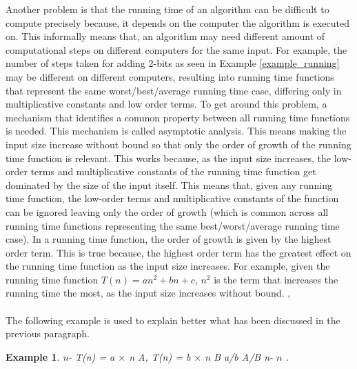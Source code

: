 \documentclass[12pt]{article}
\newtheorem{example}[definition]{Example}
\numberwithin{equation}{subsection}
\numberwithin{table}{subsection}
\numberwithin{algorithm}{subsection}
\begin{document}
Another problem is that the running time of an algorithm can be difficult to compute precisely because, it depends on the computer the algorithm is executed on. This informally means that, an algorithm may need different amount of computational steps on different computers for the same input. For example, the number of steps taken for adding 2-bits as seen in Example \ref{example_running} may be different on different computers, resulting into running time functions that represent the same worst/best/average running time case, differing only in multiplicative constants and low order terms. To get around this problem, a mechanism that identifies a common property between all running time functions is needed. This mechanism is called asymptotic analysis. This means making the input size increase without bound so that only the order of growth of the running time function is relevant. This works because, as the input size increases, the low-order terms and multiplicative constants of the running time function get dominated by the size of the input itself. This means that, given any running time function, the low-order terms and multiplicative constants of the function can be ignored leaving only the order of growth (which is common across all running time functions representing the same best/worst/average running time case). In a running time function, the order of growth is given by the highest order term. This is true because, the highest order term has the greatest effect on the running time function as the input size increases. For example, given the running time function $\mathit{T(n) = an^2+bn+c}$, $\mathit{n^2}$ is the term that increases the running time the most, as the input size increases without bound. \cite{cormen_leiserson_rivest_stein}, \cite{adamchik_2009} \\\\
The following example is used to explain better what has been discussed in the previous paragraph.
\begin{example}
{} n-{} T(n) = a $\times$ n {} A, {} T(n) = b $\times$ n {} B {} a/b {} A/B {} n-{} $n$ {}. {}
\end{example}
\end{document}
